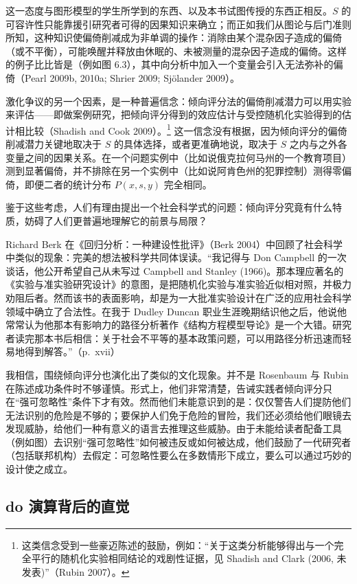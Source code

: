 这一态度与图形模型的学生所学到的东西、以及本书试图传授的东西正相反。$S$ 的可容许性只能靠援引研究者可得的因果知识来确立；而正如我们从图论与后门准则所知，这种知识使偏倚削减成为非单调的操作：消除由某个混杂因子造成的偏倚（或不平衡），可能唤醒并释放由休眠的、未被测量的混杂因子造成的偏倚。这样的例子比比皆是（例如图 6.3），其中向分析中加入一个变量会引入无法弥补的偏倚（Pearl 2009b, 2010a; Shrier 2009; Sjölander 2009）。

激化争议的另一个因素，是一种普遍信念：倾向评分法的偏倚削减潜力可以用实验来评估——即做案例研究，把倾向评分得到的效应估计与受控随机化实验得到的估计相比较（Shadish and Cook 2009）。\footnote{这类信念受到一些豪迈陈述的鼓励，例如：“关于这类分析能够得出与一个完全平行的随机化实验相同结论的戏剧性证据，见 Shadish and Clark (2006, 未发表)”（Rubin 2007）。} 这一信念没有根据，因为倾向评分的偏倚削减潜力关键地取决于 $S$ 的具体选择，或者更准确地说，取决于 $S$ 之内与之外各变量之间的因果关系。在一个问题实例中（比如说俄克拉何马州的一个教育项目）测到显著偏倚，并不排除在另一个实例中（比如说阿肯色州的犯罪控制）测得零偏倚，即便二者的统计分布 $P(x,s,y)$ 完全相同。

鉴于这些考虑，人们有理由提出一个社会科学式的问题：倾向评分究竟有什么特质，妨碍了人们更普遍地理解它的前景与局限？

Richard Berk 在《回归分析：一种建设性批评》（Berk 2004）中回顾了社会科学中类似的现象：完美的想法被科学共同体误读。“我记得与 Don Campbell 的一次谈话，他公开希望自己从未写过 Campbell and Stanley (1966)。那本理应著名的《实验与准实验研究设计》的意图，是把随机化实验与准实验近似相对照，并极力劝阻后者。然而该书的表面影响，却是为一大批准实验设计在广泛的应用社会科学领域中确立了合法性。在我于 Dudley Duncan 职业生涯晚期结识他之后，他说他常常认为他那本有影响力的路径分析著作《结构方程模型导论》是一个大错。研究者读完那本书后相信：关于社会不平等的基本政策问题，可以用路径分析迅速而轻易地得到解答。”（p.~xvii）

我相信，围绕倾向评分也演化出了类似的文化现象。并不是 Rosenbaum 与 Rubin 在陈述成功条件时不够谨慎。形式上，他们非常清楚，告诫实践者倾向评分只在“强可忽略性”条件下才有效。然而他们未能意识到的是：仅仅警告人们提防他们无法识别的危险是不够的；要保护人们免于危险的冒险，我们还必须给他们眼镜去发现威胁，给他们一种有意义的语言去推理这些威胁。由于未能给读者配备工具（例如图）去识别“强可忽略性”如何被违反或如何被达成，他们鼓励了一代研究者（包括联邦机构）去假定：可忽略性要么在多数情形下成立，要么可以通过巧妙的设计使之成立。

\subsection{do 演算背后的直觉}

